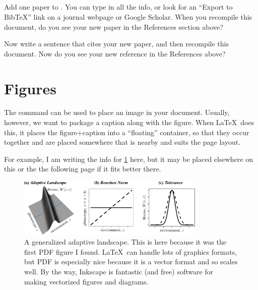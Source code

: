 \documentclass{article}
\begin{document}

\subsection{\task}

Add one paper to .
You can type in all the info, or look for an ``Export to BibTeX'' link on a journal webpage or Google Scholar.
When you recompile this document, do you see your new paper in the References section above?

Now write a sentence that cites your new paper, and then recompile this document.
Now do you see your new reference in the References above?

\section{Figures}
\label{sec:figures}

The  command can be used to place an image in your document.
Usually, however, we want to package a caption along with the figure.
When \LaTeX\ does this, it places the figure+caption into a ``floating'' container, so that they occur together and are placed somewhere that is nearby and suits the page layout.

For example, I am writing the info for \cref{fig:landscape} here, but it may be placed elsewhere on this or the the following page if it fits better there.
\begin{figure}
\centering\includegraphics[width=0.8\textwidth]{landscape.pdf}
\caption{A generalized adaptive landscape.
    This is here because it was the first PDF figure I found.
    \LaTeX\ can handle lots of graphics formats, but PDF is especially nice because it is a vector format and so scales well.
    By the way, Inkscape is fantastic (and free) software for making vectorized figures and diagrams.
}
\label{fig:landscape}
\end{figure}
\end{document}
